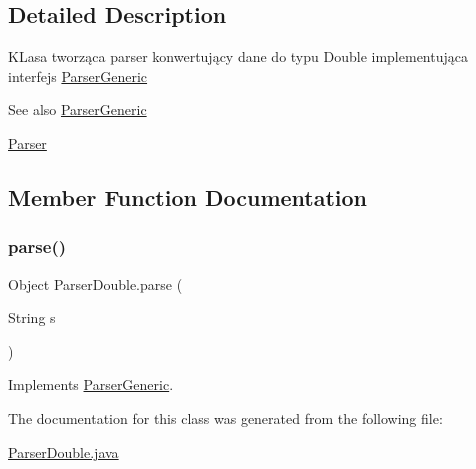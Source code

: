 \subsection{Detailed Description}
K\+Lasa tworząca parser konwertujący dane do typu Double implementująca interfejs \hyperlink{interfaceParserGeneric}{Parser\+Generic} \begin{DoxySeeAlso}{See also}
\hyperlink{interfaceParserGeneric}{Parser\+Generic} 

\hyperlink{classParser}{Parser} 
\end{DoxySeeAlso}


\subsection{Member Function Documentation}
\mbox{\label{classParserDouble_a45d2180f6c110f27347c95c2d207b462}} 
\subsubsection{\texorpdfstring{parse()}{parse()}}
{\footnotesize\ttfamily Object Parser\+Double.\+parse (\begin{DoxyParamCaption}\item[{String}]{s }\end{DoxyParamCaption})\hspace{0.3cm}{\ttfamily [inline]}}



Implements \hyperlink{interfaceParserGeneric_a42d671b89e41a5adb31a41c59db57503}{Parser\+Generic}.



The documentation for this class was generated from the following file\+:\begin{DoxyCompactItemize}
\item 
\hyperlink{ParserDouble_8java}{Parser\+Double.\+java}\end{DoxyCompactItemize}
